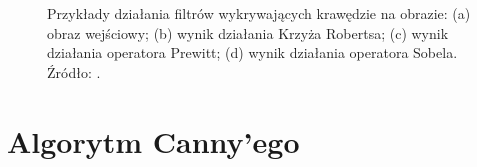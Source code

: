 \documentclass[a4paper,twocolumn,12pt]{article}
\begin{document}
\begin{figure}
 \begin{center}
 \end{center}
 \caption{
  Przykłady działania filtrów wykrywających krawędzie na obrazie:
  (a) obraz wejściowy;
  (b) wynik działania Krzyża Robertsa;
  (c) wynik działania operatora Prewitt;
  (d) wynik działania operatora Sobela.
  Źródło: \cite{maini}.
 }
 \label{fig:edges_comparison}
\end{figure}



\section{Algorytm Canny'ego} \label{sec:canny}
\end{document}
